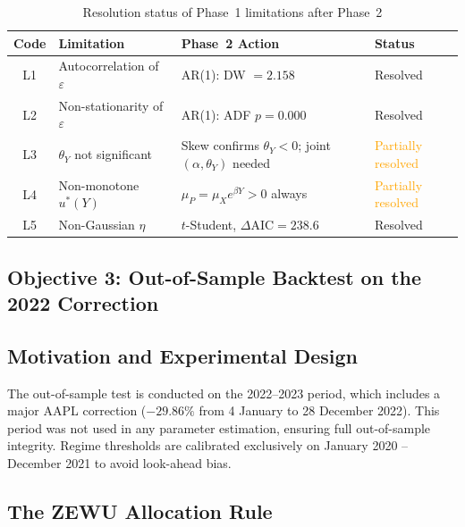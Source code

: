 \documentclass[12pt,a4paper]{article}
\theoremstyle{definition}
\theoremstyle{remark}
\begin{document}
\begin{table}[H]
  \centering
  \caption{Resolution status of Phase~1 limitations after Phase~2}
  \label{tab:corrections}
  \begin{tabular}{clll}
    \toprule
    Code & Limitation & Phase~2 Action & Status \\
    \midrule
    L1 & Autocorrelation of $\varepsilon$ & AR(1): DW $= 2.158$ &
         \textcolor{okgreen}{Resolved} \\
    L2 & Non-stationarity of $\varepsilon$ & AR(1): ADF $p = 0.000$ &
         \textcolor{okgreen}{Resolved} \\
    L3 & $\theta_Y$ not significant & Skew confirms $\theta_Y < 0$;
         joint $(\alpha,\theta_Y)$ needed &
         \textcolor{orange}{Partially resolved} \\
    L4 & Non-monotone $u^*(Y)$ & $\mu_P = \mu_X e^{\beta Y} > 0$ always &
         \textcolor{orange}{Partially resolved} \\
    L5 & Non-Gaussian $\eta$ & $t$-Student, $\Delta\mathrm{AIC} = 238.6$ &
         \textcolor{okgreen}{Resolved} \\
    \bottomrule
  \end{tabular}
\end{table}

\subsection{Objective 3: Out-of-Sample Backtest on the 2022 Correction}
\label{sec:obj3}

\subsection{Motivation and Experimental Design}

The out-of-sample test is conducted on the 2022--2023 period, which
includes a major AAPL correction ($-29.86\%$ from 4 January to 28
December 2022). This period was not used in any parameter estimation,
ensuring full out-of-sample integrity. Regime thresholds are calibrated
exclusively on January 2020 -- December 2021 to avoid look-ahead bias.

\subsection{The ZEWU Allocation Rule}
\end{document}
